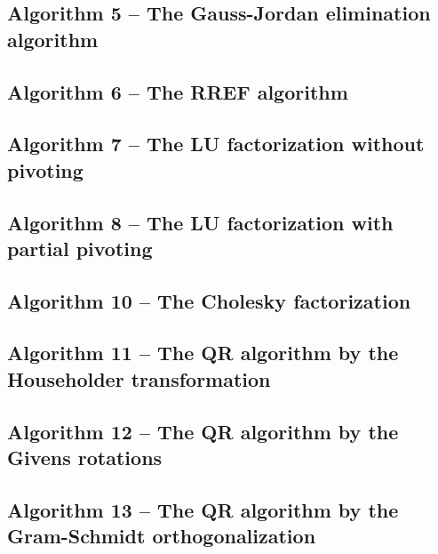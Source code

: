 \documentclass[a4paper]{article}
\begin{document}
\subsection{Algorithm 5 -- The Gauss-Jordan elimination algorithm}\label{algorithm:5}

\subsection{Algorithm 6 -- The RREF algorithm}\label{algorithm:6}

\subsection{Algorithm 7 -- The LU  factorization without pivoting}\label{algorithm:7}

\subsection{Algorithm 8 -- The LU  factorization with partial pivoting}\label{algorithm:8}

% 
\subsection{Algorithm 10 -- The Cholesky factorization}\label{algorithm:10}

\subsection{Algorithm 11 -- The  QR  algorithm  by  the  Householder  transformation}\label{algorithm:11}

\subsection{Algorithm 12 -- The QR algorithm by the Givens rotations}\label{algorithm:12}

\subsection{Algorithm 13 -- The QR algorithm by the Gram-Schmidt orthogonalization}\label{algorithm:13}



\clearpage

\nocite{Zdunek, GoluVanl96}


\end{document}
